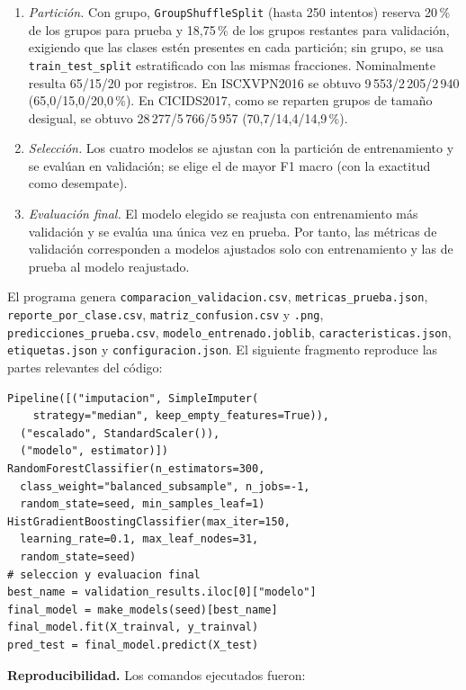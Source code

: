 \documentclass[conference]{IEEEtran}
\begin{document}
\begin{enumerate}
\item \textit{Partición.} Con grupo, \texttt{GroupShuffleSplit} (hasta 250 intentos) reserva 20\,\% de los grupos para prueba y 18,75\,\% de los grupos restantes para validación, exigiendo que las clases estén presentes en cada partición; sin grupo, se usa \texttt{train\_test\_split} estratificado con las mismas fracciones. Nominalmente resulta 65/15/20 por registros. En ISCXVPN2016 se obtuvo 9\,553/2\,205/2\,940 (65,0/15,0/20,0\,\%). En CICIDS2017, como se reparten grupos de tamaño desigual, se obtuvo 28\,277/5\,766/5\,957 (70,7/14,4/14,9\,\%).
\item \textit{Selección.} Los cuatro modelos se ajustan con la partición de entrenamiento y se evalúan en validación; se elige el de mayor F1 macro (con la exactitud como desempate).
\item \textit{Evaluación final.} El modelo elegido se reajusta con entrenamiento más validación y se evalúa una única vez en prueba. Por tanto, las métricas de validación corresponden a modelos ajustados solo con entrenamiento y las de prueba al modelo reajustado.
\end{enumerate}

{\sloppy El programa genera \texttt{comparacion\_validacion.csv}, \texttt{metricas\_prueba.json}, \texttt{reporte\_por\_clase.csv}, \texttt{matriz\_confusion.csv} y \texttt{.png}, \texttt{predicciones\_prueba.csv}, \texttt{modelo\_entrenado.joblib}, \texttt{caracteristicas.json}, \texttt{etiquetas.json} y \texttt{configuracion.json}. El siguiente fragmento reproduce las partes relevantes del código:\par}

\begin{lstlisting}
Pipeline([("imputacion", SimpleImputer(
    strategy="median", keep_empty_features=True)),
  ("escalado", StandardScaler()),
  ("modelo", estimator)])
RandomForestClassifier(n_estimators=300,
  class_weight="balanced_subsample", n_jobs=-1,
  random_state=seed, min_samples_leaf=1)
HistGradientBoostingClassifier(max_iter=150,
  learning_rate=0.1, max_leaf_nodes=31,
  random_state=seed)
# seleccion y evaluacion final
best_name = validation_results.iloc[0]["modelo"]
final_model = make_models(seed)[best_name]
final_model.fit(X_trainval, y_trainval)
pred_test = final_model.predict(X_test)
\end{lstlisting}

\textbf{Reproducibilidad.} Los comandos ejecutados fueron:
\end{document}
